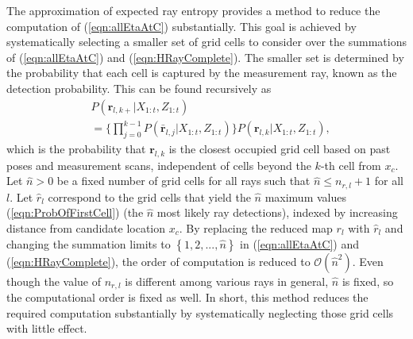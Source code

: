 \documentclass[letterpaper, 10pt, conference]{ieeeconf}
\newcommand{\braces}[1]{\ensuremath{\left\{ #1 \right\}}}
\newcommand{\refeqn}[1]{(\ref{eqn:#1})}
\begin{document}
The approximation of expected ray entropy provides a method to reduce the computation of \refeqn{allEtaAtC} substantially. This goal is achieved by systematically selecting a smaller set of grid cells to consider over the summations of \refeqn{allEtaAtC} and \refeqn{HRayComplete}.
The smaller set is determined by the probability that each cell is captured by the measurement ray, known as the detection probability. This can be found recursively as
%
%
%
\begin{align}
\label{eqn:ProbOfFirstCell}
&P(\mathbf{r}_{l,k+}|X_{1:t},Z_{1:t})\nonumber\\&=\bigg\{\prod_{j=0}^{k-1}P(\bar{\mathbf{r}}_{l,j}|X_{1:t},Z_{1:t})\bigg\}P(\mathbf{r}_{l,k}|X_{1:t},Z_{1:t}),
\end{align}
which is the probability that $\mathbf{r}_{l,k}$ is the closest occupied grid cell based on past poses and measurement scans, independent of cells beyond the $k$-th cell from $x_c$.
Let $\hat n>0$ be a fixed number of grid cells for all rays such that $\hat n\leq n_{r,l}+1$ for all $l$.
Let $\hat{r}_{l}$ correspond to the grid cells that yield the $\hat{n}$ maximum values \refeqn{ProbOfFirstCell} (the $\hat n$ most likely ray detections), indexed by increasing distance from candidate location $x_c$.
By replacing the reduced map $r_l$ with $\hat{r}_l$ and changing the summation limits to $\braces{1,2,...,\hat n}$ in \refeqn{allEtaAtC} and \refeqn{HRayComplete}, the order of computation is reduced to $\mathcal O({\hat{n}}^2)$.
Even though the value of $n_{r,l}$ is different among various rays in general, $\hat n$ is fixed, so the computational order is fixed as well.
In short, this method reduces the required computation substantially by systematically neglecting those grid cells with little effect.
%
%
\end{document}
